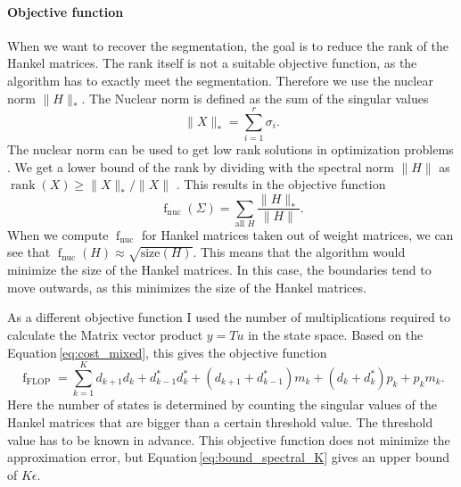 \documentclass[numbers=noenddot,doctype=mastersthesis,BCOR=15mm,biblatex]{ldvbook}%
\DeclareMathOperator{\rank}{rank}
\DeclareMathOperator{\f}{f}
\newcommand{\da}{d^*} %
\begin{document}
\paragraph{Objective function}
When we want to recover the segmentation, the goal is to reduce the rank of the Hankel matrices.
The rank itself is not a suitable objective function, as the algorithm has to exactly meet the segmentation.
Therefore we use the nuclear norm $\|H\|_*$.
The Nuclear norm is defined as the sum of the singular values
\begin{equation}
	\|X\|_* = \sum_{i=1}^r \sigma_i
	.
\end{equation}
The nuclear norm can be used to get low rank solutions in optimization problems \cite{liu_interior-point_2010}.
We get a lower bound of the rank by dividing with the spectral norm $\|H\|$ as $\rank(X) \geq \|X\|_*/\|X\|$ \cite{recht_guaranteed_2010}.
This results in the objective function
\begin{equation}\label{eq:objective_nuc}
	\f_{\text{nuc}}(\Sigma)= \sum_{\text{all } H} \frac{\|H\|_*}{\|H\|}
	.
\end{equation}
When we compute $\f_{\text{nuc}}$ for Hankel matrices taken out of weight matrices, we can see that $\f_{\text{nuc}}(H) \approx \sqrt{\text{size}(H)}$.
This means that the algorithm would minimize the size of the Hankel matrices.
In this case, the boundaries tend to move outwards, as this minimizes the size of the Hankel matrices.


As a different objective function I used the number of multiplications required to calculate the Matrix vector product $y=Tu$ in the state space.
Based on the Equation\,\ref{eq:cost_mixed}, this gives the objective function
\begin{equation}\label{eq:objective_flop}
\f_{\text{FLOP}} = \sum_{k=1}^Kd_{k+1}d_k + \da_{k-1}\da_k + (d_{k+1}+\da_{k-1})m_k +(d_k+\da_k)p_k +p_km_k 
.
\end{equation}
Here the number of states is determined by counting the singular values of the Hankel matrices that are bigger than a certain threshold value. 
The threshold value has to be known in advance.
This objective function does not minimize the approximation error, but Equation\,\ref{eq:bound_spectral_K} gives an upper bound of $K\epsilon$.
\end{document}
